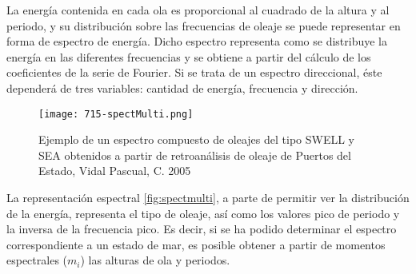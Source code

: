 La energía contenida en cada ola es proporcional al cuadrado de la
altura y al periodo, y su distribución sobre las frecuencias de oleaje
se puede representar en forma de espectro de energía. Dicho espectro
representa como se distribuye la energía en las diferentes frecuencias y
se obtiene a partir del cálculo de los coeficientes de la serie de
Fourier. Si se trata de un espectro direccional, éste dependerá de tres
variables: cantidad de energía, frecuencia y dirección.

\begin{figure}
\centering
\texttt{[image: 715-spectMulti.png]}
\caption[Espectro oleaje]{Ejemplo de un espectro compuesto de oleajes del tipo SWELL y SEA obtenidos a partir de retroanálisis de oleaje de Puertos del Estado, Vidal Pascual, C. 2005}
\label{fig:spectmulti}
\end{figure}

La representación espectral \autoref{fig:spectmulti}, a parte de permitir ver la distribución de
la energía, representa el tipo de oleaje, así como los valores pico de
periodo y la inversa de la frecuencia pico. Es decir, si se ha podido
determinar el espectro correspondiente a un estado de mar, es posible
obtener a partir de momentos espectrales (\(m_i\)) las alturas de ola y
periodos.
